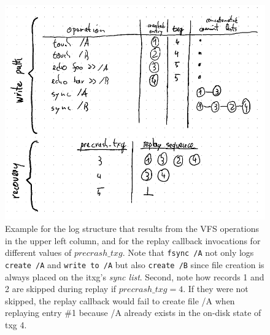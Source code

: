 \documentclass[12pt,a4paper,twoside]{book}
\begin{document}
\begin{figure}[H]
    \centering
    \includegraphics{fig/zil_writepath_and_replay_sequence_logical_level}
    \caption{
        Example for the log structure that results from the VFS operations in the upper left column, and for the replay callback invocations for different values of $precrash\_txg$.
        Note that \lstinline{fsync /A} not only logs \lstinline{create /A} and \lstinline{write to /A} but also \lstinline{create /B} since file creation is always placed on the itxg's \textit{sync list}.
        Second, note how records 1 and 2 are skipped during replay if $precrash\_txg = 4$.
        If they were not skipped, the replay callback would fail to create file /A when replaying entry \#1 because /A already exists in the on-disk state of txg 4.
    }
    \label{fig:zil_writepath_and_replay_sequence_logical_level}
\end{figure}
\end{document}
